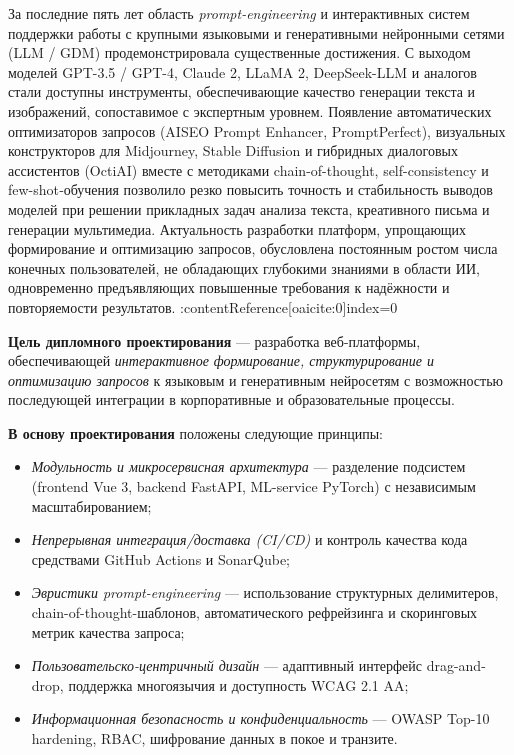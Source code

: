 
За последние пять лет область \textit{prompt-engineering} и интерактивных
систем поддержки работы с крупными языковыми и генеративными нейронными
сетями (LLM / GDM) продемонстрировала существенные достижения.
С выходом моделей GPT-3.5 / GPT-4, Claude 2, LLaMA 2, DeepSeek-LLM и
аналогов стали доступны инструменты, обеспечивающие качество генерации
текста и изображений, сопоставимое с экспертным уровнем.  Появление
автоматических оптимизаторов запросов (AISEO Prompt Enhancer,
PromptPerfect), визуальных конструкторов для Midjourney, Stable Diffusion
и гибридных диалоговых ассистентов (OctiAI) вместе с методиками
chain-of-thought, self-consistency и few-shot‐обучения позволило резко
повысить точность и стабильность выводов моделей при решении прикладных
задач анализа текста, креативного письма и генерации мультимедиа.
Актуальность разработки платформ, упрощающих формирование и
оптимизацию запросов, обусловлена постоянным ростом числа конечных
пользователей, не обладающих глубокими знаниями в области ИИ,
одновременно предъявляющих повышенные требования к
надёжности и повторяемости результатов. :contentReference[oaicite:0]{index=0}

\bigskip
\textbf{Цель дипломного проектирования} — разработка
веб-платформы, обеспечивающей \emph{интерактивное формирование,
структурирование и оптимизацию запросов} к языковым и генеративным
нейросетям с возможностью последующей интеграции в корпоративные
и образовательные процессы.

\bigskip
\textbf{В основу проектирования} положены следующие принципы:
\begin{itemize}
  \item \emph{Модульность и микросервисная архитектура} —
        разделение подсистем (frontend Vue 3, backend FastAPI,
        ML-service PyTorch) с независимым масштабированием;
  \item \emph{Непрерывная интеграция/доставка (CI/CD)} и контроль
        качества кода средствами GitHub Actions и SonarQube;
  \item \emph{Эвристики prompt-engineering} — использование
        структурных делимитеров, chain-of-thought-шаблонов,
        автоматического рефрейзинга и скоринговых метрик качества
        запроса;
  \item \emph{Пользовательско-центричный дизайн} —
        адаптивный интерфейс drag-and-drop, поддержка многоязычия и
        доступность WCAG 2.1 AA;
  \item \emph{Информационная безопасность и конфиденциальность} —
        OWASP Top-10 hardening, RBAC, шифрование данных в покое
        и транзите.
\end{itemize}

